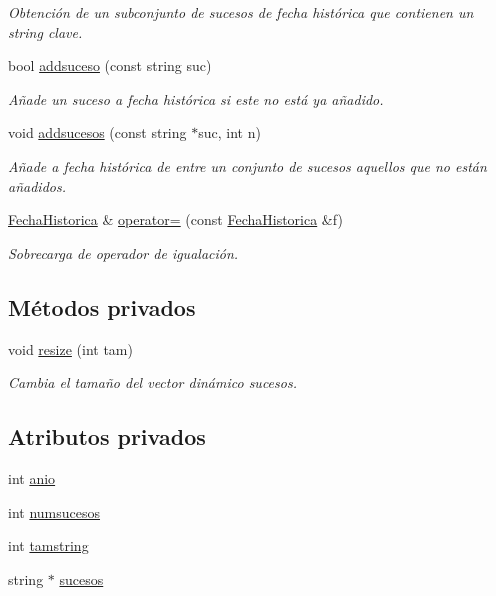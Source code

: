 \begin{DoxyCompactItemize}
\begin{DoxyCompactList}\small\item\em Obtención de un subconjunto de sucesos de fecha histórica que contienen un string clave. \end{DoxyCompactList}\item 
bool \hyperlink{classFechaHistorica_a8b33dd186ca2770af79ff6b8e45715de}{addsuceso} (const string suc)
\begin{DoxyCompactList}\small\item\em Añade un suceso a fecha histórica si este no está ya añadido. \end{DoxyCompactList}\item 
void \hyperlink{classFechaHistorica_a0062ff553d68ee41842d19678254c27a}{addsucesos} (const string $\ast$suc, int n)
\begin{DoxyCompactList}\small\item\em Añade a fecha histórica de entre un conjunto de sucesos aquellos que no están añadidos. \end{DoxyCompactList}\item 
\hyperlink{classFechaHistorica}{Fecha\+Historica} \& \hyperlink{classFechaHistorica_a712415b87f836c744f47b697ef0ff2aa}{operator=} (const \hyperlink{classFechaHistorica}{Fecha\+Historica} \&f)
\begin{DoxyCompactList}\small\item\em Sobrecarga de operador de igualación. \end{DoxyCompactList}\end{DoxyCompactItemize}
\subsection*{Métodos privados}
\begin{DoxyCompactItemize}
\item 
void \hyperlink{classFechaHistorica_a87e1ed09c8b726f325b544459a9c9ef9}{resize} (int tam)
\begin{DoxyCompactList}\small\item\em Cambia el tamaño del vector dinámico sucesos. \end{DoxyCompactList}\end{DoxyCompactItemize}
\subsection*{Atributos privados}
\begin{DoxyCompactItemize}
\item 
int \hyperlink{classFechaHistorica_ade873215978862ec3ca4fcaa1fd33a07}{anio}
\item 
int \hyperlink{classFechaHistorica_a92979fbdc8d9575f18092759f4f192cb}{numsucesos}
\item 
int \hyperlink{classFechaHistorica_aec4c1897c2fbc123365211ca065783a0}{tamstring}
\item 
string $\ast$ \hyperlink{classFechaHistorica_a31f925ce9ed8b6d420480295724965a8}{sucesos}
\end{DoxyCompactItemize}
